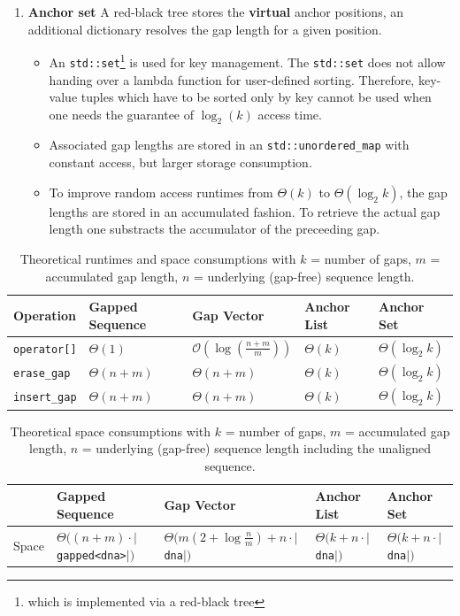\documentclass[11pt, letterpaper, twoside]{article}
\begin{document}
\begin{enumerate}
\begin{itemize}
    \end{itemize}
    \item {\bf Anchor set} A red-black tree stores the {\bf virtual} anchor positions, an additional dictionary resolves the gap length for a given position.
	\begin{itemize}
		\item An \verb|std::set|\footnote{which is implemented via a red-black tree} is used for key management. The \verb|std::set| does not allow handing over a lambda function for user-defined sorting. Therefore, key-value tuples which have to be sorted only by key cannot be used when one needs the guarantee of $\log_2(k)$ access time.   
		\item Associated gap lengths are stored in an \verb|std::unordered_map| with constant access, but larger storage consumption.
		\item To improve random access runtimes from $\Theta(k)$ to $\Theta(\log_2 k)$, the gap lengths are stored in an accumulated fashion. To retrieve the actual gap length one substracts the accumulator of the preceeding gap.
	\end{itemize}
\end{enumerate}

\begin{table}[htpb]\centering
\begin{tabular}{|l|l|l|l|l|}
\hline
\bf Operation&\bf Gapped Sequence&\bf Gap Vector&\bf Anchor List&\bf Anchor Set\\
\hline
\verb|operator[]|&$\Theta(1)$&$\mathcal{O}(\log(\frac{n+m}{m}))$\footnotemark&$\Theta(k)$&$\Theta(\log_2 k)$\\
\verb|erase_gap|&$\Theta(n+m)$&$\Theta(n+m)$&$\Theta(k)$&$\Theta(\log_2 k)$\\
\verb|insert_gap|&$\Theta(n+m)$&$\Theta (n+m)$&$\Theta(k)$&$\Theta(\log_2 k)$\\
\hline
\end{tabular}\caption{Theoretical runtimes and space consumptions with $k$ = number of gaps, $m$ = accumulated gap length, $n$ = underlying (gap-free) sequence length.}	
\end{table}

\begin{table}[htpb]\centering
{\small
\begin{tabular}{|l|l|l|l|l|}
\hline
&\bf Gapped Sequence&\bf Gap Vector&\bf Anchor List&\bf Anchor Set\\
\hline
Space&$\Theta \big ( (n+m)\cdot |$\verb|gapped<dna>|$|\big )$&$\Theta \big ( m(2+\log \frac{n}{m}) + n\cdot|$\verb|dna|$|\big ) $&$\Theta (k + n\cdot |$\verb|dna|$|)$&$\Theta (k+ n\cdot |$\verb|dna|$|)$\\
\hline
\end{tabular}\caption{Theoretical space consumptions with $k$ = number of gaps, $m$ = accumulated gap length, $n$ = underlying (gap-free) sequence length including the unaligned sequence.}	
}
\end{table}
\end{document}
